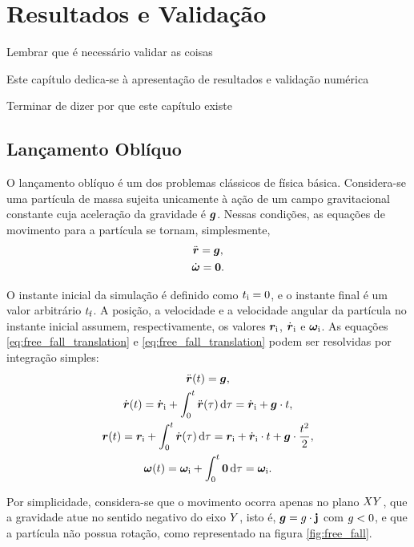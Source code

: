 \chapter{Resultados e Validação} \label{ch:results}

\alert{Lembrar que é necessário validar as coisas}

Este capítulo dedica-se à apresentação de resultados e validação numérica 

\alert{Terminar de dizer por que este capítulo existe}

\section{Lançamento Oblíquo}

O lançamento oblíquo é um dos problemas clássicos de física básica. Considera-se uma partícula de massa sujeita unicamente à ação de um campo gravitacional constante cuja aceleração da gravidade é \(\bm{g}\). Nessas condições, as equações de movimento para a partícula se tornam, simplesmente,
\begin{gather}
	\acceleration = \gravity, \label{eq:free_fall_translation}\\
	\angularAcceleration = \nullVector \label{eq:free_fall_rotation}.
\end{gather}

O instante inicial da simulação é definido como \({t}_{\text{i}}=0\), e o instante final é um valor arbitrário \({t}_{\text{f}}\). A posição, a velocidade e a velocidade angular da partícula no instante inicial assumem, respectivamente, os valores \({\bm{r}}_{\text{i}}\), \(\initial{\velocity}\) e \({\bm{\omega}}_{\text{i}}\). As equações \eqref{eq:free_fall_translation} e \eqref{eq:free_fall_translation} podem ser resolvidas por integração simples:
\begin{gather*}
	\acceleration\pqty{t} = \gravity, \\
	\velocity\pqty{t} = \initial{\velocity} + \int_{0}^{t} \acceleration\pqty{\tau} \dd{\tau} = \initial{\velocity} + \gravity\cdot t, \\
	\position\pqty{t} = \initial{\position} + \int_{0}^{t} \velocity\pqty{\tau} \dd{\tau} = \initial{\position} + \initial{\velocity}\cdot t + \gravity\cdot \dfrac{t^2}{2}, \\
	\angularVelocity\pqty{t} = \initial{\angularVelocity} + \int_{0}^{t} \nullVector \dd{\tau} = \initial{\angularVelocity}.
\end{gather*}

Por simplicidade, considera-se que o movimento ocorra apenas no plano \(XY\), que a gravidade atue no sentido negativo do eixo \(Y\), isto é, \(\bm{g} = g\cdot\mathbf{j}\) com \(g<0\), e que a partícula não possua rotação, como representado na figura \ref{fig:free_fall}.

